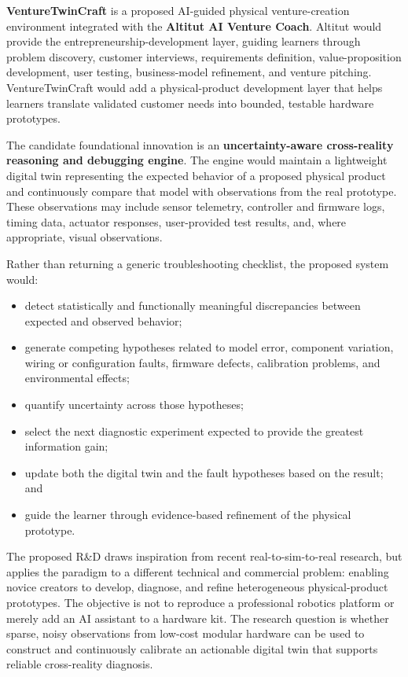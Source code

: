 \textbf{VentureTwinCraft} is a proposed AI-guided physical venture-creation environment integrated with the \textbf{Altitut AI Venture Coach}. Altitut would provide the entrepreneurship-development layer, guiding learners through problem discovery, customer interviews, requirements definition, value-proposition development, user testing, business-model refinement, and venture pitching. VentureTwinCraft would add a physical-product development layer that helps learners translate validated customer needs into bounded, testable hardware prototypes.

The candidate foundational innovation is an \textbf{uncertainty-aware cross-reality reasoning and debugging engine}. The engine would maintain a lightweight digital twin representing the expected behavior of a proposed physical product and continuously compare that model with observations from the real prototype. These observations may include sensor telemetry, controller and firmware logs, timing data, actuator responses, user-provided test results, and, where appropriate, visual observations.

Rather than returning a generic troubleshooting checklist, the proposed system would:

\begin{itemize}
    \item detect statistically and functionally meaningful discrepancies between expected and observed behavior;
    \item generate competing hypotheses related to model error, component variation, wiring or configuration faults, firmware defects, calibration problems, and environmental effects;
    \item quantify uncertainty across those hypotheses;
    \item select the next diagnostic experiment expected to provide the greatest information gain;
    \item update both the digital twin and the fault hypotheses based on the result; and
    \item guide the learner through evidence-based refinement of the physical prototype.
\end{itemize}


The proposed R\&D draws inspiration from recent real-to-sim-to-real research, but applies the paradigm to a different technical and commercial problem: enabling novice creators to develop, diagnose, and refine heterogeneous physical-product prototypes. The objective is not to reproduce a professional robotics platform or merely add an AI assistant to a hardware kit. The research question is whether sparse, noisy observations from low-cost modular hardware can be used to construct and continuously calibrate an actionable digital twin that supports reliable cross-reality diagnosis.

